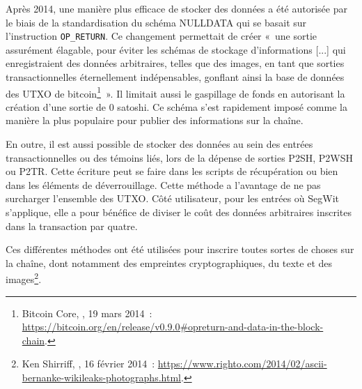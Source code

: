 Après 2014, une manière plus efficace de stocker des données a été autorisée par le biais de la standardisation du schéma NULLDATA qui se basait sur l'instruction \texttt{OP\_RETURN}. Ce changement permettait de créer «~une sortie assurément élagable, pour éviter les schémas de stockage d'informations [...] qui enregistraient des données arbitraires, telles que des images, en tant que sorties transactionnelles éternellement indépensables, gonflant ainsi la base de données des UTXO de bitcoin\footnote{Bitcoin Core, , 19 mars 2014~: \url{https://bitcoin.org/en/release/v0.9.0\#opreturn-and-data-in-the-block-chain}.}~». Il limitait aussi le gaspillage de fonds en autorisant la création d'une sortie de 0 satoshi. Ce schéma s'est rapidement imposé comme la manière la plus populaire pour publier des informations sur la chaîne. %

En outre, il est aussi possible de stocker des données au sein des entrées transactionnelles ou des témoins liés, lors de la dépense de sorties P2SH, P2WSH ou P2TR. Cette écriture peut se faire dans les scripts de récupération ou bien dans les éléments de déverrouillage. Cette méthode a l'avantage de ne pas surcharger l'ensemble des UTXO. Côté utilisateur, pour les entrées où SegWit s'applique, elle a pour bénéfice de diviser le coût des données arbitraires inscrites dans la transaction par quatre.


Ces différentes méthodes ont été utilisées pour inscrire toutes sortes de choses sur la chaîne, dont notamment des empreintes cryptographiques, du texte et des images\footnote{Ken Shirriff, , 16 février 2014~: \url{https://www.righto.com/2014/02/ascii-bernanke-wikileaks-photographs.html}.}.

